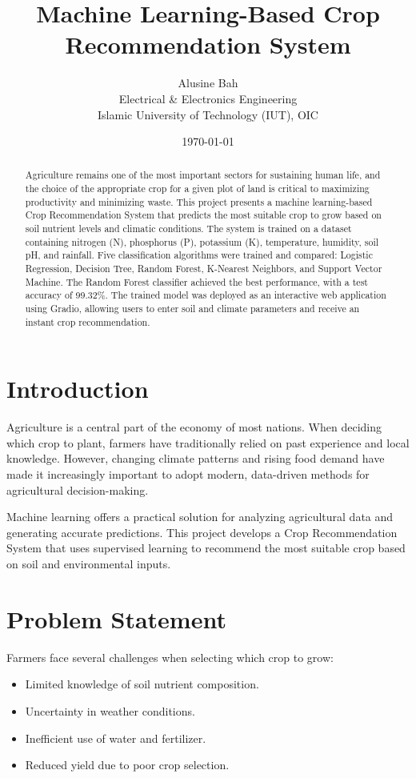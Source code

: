 \documentclass[11pt,a4paper]{article}
\title{\textbf{Machine Learning-Based Crop Recommendation System}}
\author{Alusine Bah \\ \small Electrical \& Electronics Engineering \\ \small Islamic University of Technology (IUT), OIC}
\date{\today}
\begin{document}
\maketitle
\thispagestyle{empty}

\begin{abstract}
\noindent
Agriculture remains one of the most important sectors for sustaining human life, and the choice of the appropriate crop for a given plot of land is critical to maximizing productivity and minimizing waste. This project presents a machine learning-based Crop Recommendation System that predicts the most suitable crop to grow based on soil nutrient levels and climatic conditions. The system is trained on a dataset containing nitrogen (N), phosphorus (P), potassium (K), temperature, humidity, soil pH, and rainfall. Five classification algorithms were trained and compared: Logistic Regression, Decision Tree, Random Forest, K-Nearest Neighbors, and Support Vector Machine. The Random Forest classifier achieved the best performance, with a test accuracy of 99.32\%. The trained model was deployed as an interactive web application using Gradio, allowing users to enter soil and climate parameters and receive an instant crop recommendation.
\end{abstract}

\section{Introduction}

Agriculture is a central part of the economy of most nations. When deciding which crop to plant, farmers have traditionally relied on past experience and local knowledge. However, changing climate patterns and rising food demand have made it increasingly important to adopt modern, data-driven methods for agricultural decision-making.

Machine learning offers a practical solution for analyzing agricultural data and generating accurate predictions. This project develops a Crop Recommendation System that uses supervised learning to recommend the most suitable crop based on soil and environmental inputs.

\section{Problem Statement}

Farmers face several challenges when selecting which crop to grow:
\begin{itemize}
    \item Limited knowledge of soil nutrient composition.
    \item Uncertainty in weather conditions.
    \item Inefficient use of water and fertilizer.
    \item Reduced yield due to poor crop selection.
\end{itemize}
\end{document}

